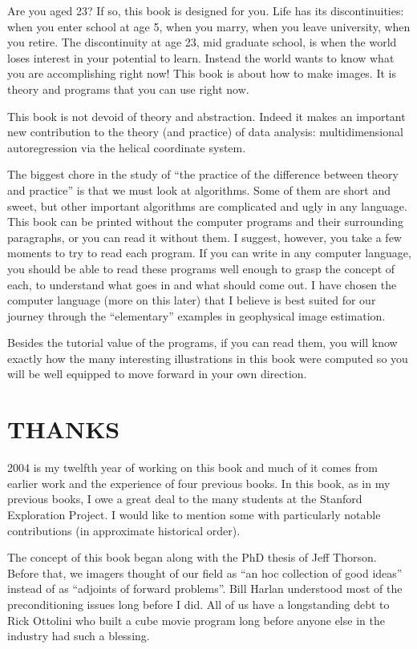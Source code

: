Are you aged 23? If so, this book is designed for you. Life has its
discontinuities: when you enter school at age 5, when you marry, when
you leave university, when you retire. The discontinuity at age 23,
mid graduate school, is when the world loses interest in your
potential to learn. Instead the world wants to know what you are
accomplishing right now! This book is about how to make images. It is
theory and programs that you can use right now.  

This book is not devoid of theory and abstraction. Indeed it makes an
important new contribution to the theory (and practice) of data
analysis: multidimensional autoregression via the helical coordinate
system.

The biggest chore in the study of ``the practice of the difference
between theory and practice'' is that we must look at algorithms. Some
of them are short and sweet, but other important algorithms are
complicated and ugly in any language. This book can be printed without
the computer programs and their surrounding paragraphs, or you can
read it without them. I suggest, however, you take a few moments to
try to read each program. If you can write in any computer language,
you should be able to read these programs well enough to grasp the
concept of each, to understand what goes in and what should come
out. I have chosen the computer language (more on this later) that I
believe is best suited for our journey through the ``elementary''
examples in geophysical image estimation.  

Besides the tutorial value of the programs, if you can read them, you
will know exactly how the many interesting illustrations in this book
were computed so you will be well equipped to move forward in your own
direction.

\section*{THANKS}

2004 is my twelfth year of working on this book and much of it comes
from earlier work and the experience of four previous books. In this
book, as in my previous books, I owe a great deal to the many students
at the Stanford Exploration Project. I would like to mention some with
particularly notable contributions (in approximate historical order).

The concept of this book began along with the PhD thesis of Jeff
Thorson. Before that, we imagers thought of our field as ``an hoc
collection of good ideas'' instead of as ``adjoints of forward
problems''. Bill Harlan understood most of the preconditioning issues
long before I did. All of us have a longstanding debt to Rick Ottolini
who built a cube movie program long before anyone else in the industry
had such a blessing.

